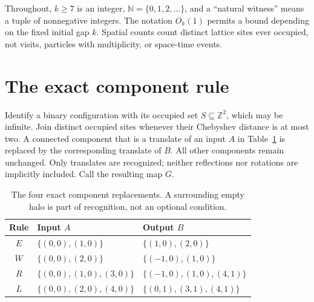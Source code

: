 \documentclass[11pt,letterpaper]{article}
\numberwithin{equation}{section}
\theoremstyle{definition}
\theoremstyle{remark}
\newcommand{\Z}{\mathbb Z}
\newcommand{\NN}{\mathbb N}
\begin{document}
Throughout, $k\ge7$ is an integer, $\NN=\{0,1,2,\ldots\}$, and a ``natural witness'' means a tuple of nonnegative integers. The notation $O_k(1)$ permits a bound depending on the fixed initial gap $k$. Spatial counts count distinct lattice sites ever occupied, not visits, particles with multiplicity, or space-time events.

\section{The exact component rule}\label{smc:bp:sec:rule}
Identify a binary configuration with its occupied set $S\subseteq\Z^2$, which may be infinite. Join distinct occupied sites whenever their Chebyshev distance is at most two. A connected component that is a translate of an input $A$ in Table~\ref{smc:bp:tab:rule} is replaced by the corresponding translate of $B$. All other components remain unchanged. Only translates are recognized; neither reflections nor rotations are implicitly included. Call the resulting map $G$.

\begin{table}[htbp]\centering
\begin{tabular}{cll}\toprule
Rule & Input $A$ & Output $B$\\\midrule
$E$ & $\{(0,0),(1,0)\}$ & $\{(1,0),(2,0)\}$\\
$W$ & $\{(0,0),(2,0)\}$ & $\{(-1,0),(1,0)\}$\\
$R$ & $\{(0,0),(1,0),(3,0)\}$ & $\{(-1,0),(1,0),(4,1)\}$\\
$L$ & $\{(0,0),(2,0),(4,0)\}$ & $\{(0,1),(3,1),(4,1)\}$\\\bottomrule
\end{tabular}
\caption{The four exact component replacements. A surrounding empty halo is part of recognition, not an optional condition.}\label{smc:bp:tab:rule}
\end{table}
\end{document}
